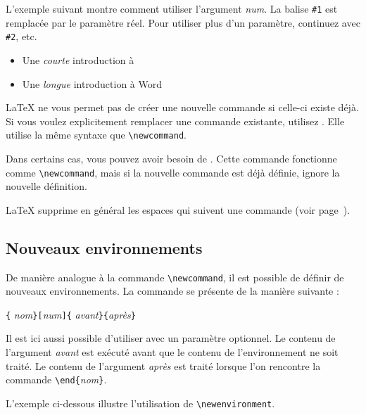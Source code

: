 L'exemple suivant montre comment utiliser l'argument \emph{num}. La
balise \verb|#1| est remplacée par le paramètre réel.
Pour utiliser plus d'un paramètre, continuez avec \verb|#2|, etc.

\begin{example}
\newcommand{\uxil}[2]
    {Une \emph{#1}  
     introduction à #2}
\begin{itemize}
  \item \uxil{courte}{\LaTeXe}
  \item \uxil{longue}{Word}
\end{itemize}
\end{example}

\LaTeX{} ne vous permet pas de créer une nouvelle commande si celle-ci
existe déjà. Si vous voulez explicitement remplacer une commande
existante, utilisez . Elle utilise la même syntaxe
que \verb|\newcommand|. 

Dans certains cas, vous pouvez avoir besoin de
. Cette commande fonctionne comme
\verb|\newcommand|, mais si la nouvelle commande est déjà définie,
\LaTeXe{} ignore  la nouvelle définition.

\LaTeX{} supprime en général les espaces qui suivent une commande
(voir page~\pageref{whitespace}).

\subsection{Nouveaux environnements}

De manière analogue à la commande \verb|\newcommand|, il est possible
de définir de nouveaux environnements.  La commande
 se présente de la manière suivante :

\begin{lscommand}
\verb|{|%
       \emph{nom}\verb|}[|\emph{num}\verb|]{|%
       \emph{avant}\verb|}{|\emph{après}\verb|}|
\end{lscommand}

Il est ici aussi possible d'utiliser
 avec un paramètre optionnel. Le contenu de
l'argument \emph{avant} est exécuté avant que le contenu de
l'environnement ne soit traité. Le contenu de l'argument \emph{après}
est traité lorsque l'on rencontre la commande
\verb|\end{|\emph{nom}\verb|}|.

L'exemple ci-dessous illustre l'utilisation de \verb|\newenvironment|.

